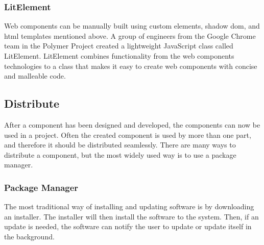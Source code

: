 \subsubsection{LitElement}%
\label{ssub:LitElement}
Web components can be manually built using custom elements, shadow \acrshort{dom}, and \acrshort{html} templates mentioned above. A group of engineers from the Google Chrome team in the Polymer Project \cite{polymerPolymerProject} created a lightweight JavaScript class called LitElement. LitElement combines functionality from the web components technologies to a class that makes it easy to create web components with concise and malleable code.








\subsection{Distribute}%
\label{sub:Distribute}
After a \gls{component} has been designed and developed, the \glspl{component} can now be used in a project. Often the created \gls{component} is used by more than one part, and therefore it should be distributed seamlessly. There are many ways to distribute a \gls{component}, but the most widely used way is to use a package manager.


\subsubsection{Package Manager}%
\label{sub:Package Manager}

The most traditional way of installing and updating software is by downloading an installer. The installer will then install the software to the system. Then, if an update is needed, the software can notify the user to update or update itself in the background. 

